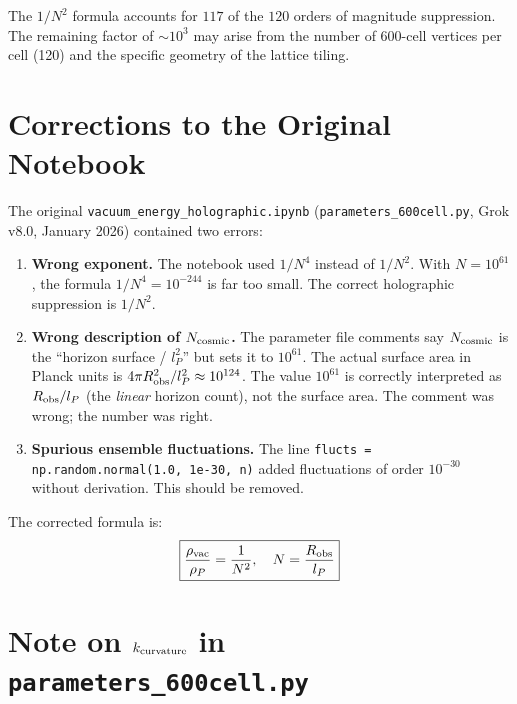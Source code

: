 \documentclass[11pt]{article}
\begin{document}
The $1/N^2$ formula accounts for $117$ of the $120$ orders of
magnitude suppression.  The remaining factor of $\sim 10^3$ may
arise from the number of 600-cell vertices per cell (120) and
the specific geometry of the lattice tiling.

\section{Corrections to the Original Notebook}

The original \texttt{vacuum\_energy\_holographic.ipynb}
(\texttt{parameters\_600cell.py}, Grok v8.0, January 2026)
contained two errors:

\begin{enumerate}
\item \textbf{Wrong exponent.}  The notebook used $1/N^4$ instead of
  $1/N^2$.  With $N = 10^{61}$, the formula $1/N^4 = 10^{-244}$
  is far too small.  The correct holographic suppression is $1/N^2$.

\item \textbf{Wrong description of $N_{\rm cosmic}$.}
  The parameter file comments say $N_{\rm cosmic}$ is the
  ``horizon surface / $l_P^2$'' but sets it to $10^{61}$.
  The actual surface area in Planck units is
  $4\pi R_{\rm obs}^2/l_P^2 \approx 10^{124}$.
  The value $10^{61}$ is correctly interpreted as $R_{\rm obs}/l_P$
  (the \emph{linear} horizon count), not the surface area.
  The comment was wrong; the number was right.

\item \textbf{Spurious ensemble fluctuations.}
  The line \texttt{flucts = np.random.normal(1.0, 1e-30, n)}
  added fluctuations of order $10^{-30}$ without derivation.
  This should be removed.
\end{enumerate}

The corrected formula is:
\begin{equation}
\boxed{
\frac{\rho_{\rm vac}}{\rho_P}
= \frac{1}{N^2},\quad N = \frac{R_{\rm obs}}{l_P}
}
\end{equation}

\section{Note on $k_{\rm curvature}$ in \texttt{parameters\_600cell.py}}
\end{document}
